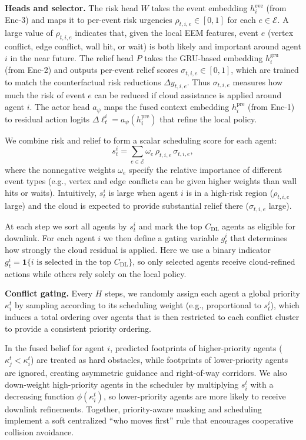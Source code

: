 \documentclass[conference]{IEEEtran}
\begin{document}
\textbf{Heads and selector.}
The risk head $W$ takes the event embedding $h_i^{\mathrm{eve}}$ (from Enc-3) and maps it to per-event risk urgencies $\rho_{t,i,e} \in [0,1]$ for each $e \in \mathcal{E}$. A large value of $\rho_{t,i,e}$ indicates that, given the local EEM features, event $e$ (vertex conflict, edge conflict, wall hit, or wait) is both likely and important around agent $i$ in the near future. The relief head $P$ takes the GRU-based embedding $h_i^{\mathrm{gru}}$ (from Enc-2) and outputs per-event relief scores $\sigma_{t,i,e} \in [0,1]$, which are trained to match the counterfactual risk reductions $\Delta y_{t,i,e}$. Thus $\sigma_{t,i,e}$ measures how much the risk of event $e$ can be reduced if cloud assistance is applied around agent $i$. The actor head $a_\psi$ maps the fused context embedding $h_i^{\mathrm{pre}}$ (from Enc-1) to residual action logits $\Delta \ell_t^i = a_\psi(h_i^{\mathrm{pre}})$ that refine the local policy.

We combine risk and relief to form a scalar scheduling score for each agent:
\[
s_t^i = \sum_{e\in\mathcal{E}} \omega_e \, \rho_{t,i,e}\, \sigma_{t,i,e},
\tag{7}
\]
where the nonnegative weights $\omega_e$ specify the relative importance of different event types (e.g., vertex and edge conflicts can be given higher weights than wall hits or waits). Intuitively, $s_t^i$ is large when agent $i$ is in a high-risk region ($\rho_{t,i,e}$ large) and the cloud is expected to provide substantial relief there ($\sigma_{t,i,e}$ large).

At each step we sort all agents by $s_t^i$ and mark the top $C_{\mathrm{DL}}$ agents as eligible for downlink. For each agent $i$ we then define a gating variable $g_t^i$ that determines how strongly the cloud residual is applied. Here we use a binary indicator $g_t^i = \mathbf{1}\{i \text{ is selected in the top } C_{\mathrm{DL}}\}$, so only selected agents receive cloud-refined actions while others rely solely on the local policy.


\textbf{Conflict gating.}
Every $H$ steps, we randomly assign each agent a global priority $\kappa_i^t$ by sampling according to its scheduling weight (e.g., proportional to $s_t^i$), which induces a total ordering over agents that is then restricted to each conflict cluster to provide a consistent priority ordering.

In the fused belief for agent $i$, predicted footprints of higher-priority
agents ($\kappa_j^t<\kappa_i^t$) are treated as hard obstacles, while
footprints of lower-priority agents are ignored, creating asymmetric guidance
and right-of-way corridors.
We also down-weight high-priority agents in the scheduler by multiplying
$s_i^t$ with a decreasing function $\phi(\kappa_i^t)$, so lower-priority agents
are more likely to receive downlink refinements.
Together, priority-aware masking and scheduling implement a soft centralized
``who moves first'' rule that encourages cooperative collision avoidance.
\end{document}
